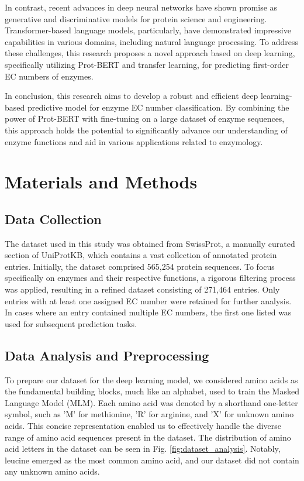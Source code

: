 \documentclass[conference]{IEEEtran}
\begin{document}
In contrast, recent advances in deep neural networks have shown promise as generative and discriminative models for protein science and engineering\cite{16}. Transformer-based language models, particularly, have demonstrated impressive capabilities in various domains, including natural language processing\cite{17}. To address these challenges, this research proposes a novel approach based on deep learning, specifically utilizing Prot-BERT\cite{18} and transfer learning, for predicting first-order EC numbers of enzymes.

In conclusion, this research aims to develop a robust and efficient deep learning-based predictive model for enzyme EC number classification. By combining the power of Prot-BERT with fine-tuning on a large dataset of enzyme sequences, this approach holds the potential to significantly advance our understanding of enzyme functions and aid in various applications related to enzymology.

\newpage


\section{Materials and Methods}\label{sec11}

\subsection{Data Collection}

The dataset used in this study was obtained from SwissProt, a manually curated section of UniProtKB, which contains a vast collection of annotated protein entries\cite{19}. Initially, the dataset comprised 565,254 protein sequences. To focus specifically on enzymes and their respective functions, a rigorous filtering process was applied, resulting in a refined dataset consisting of 271,464 entries. Only entries with at least one assigned EC number were retained for further analysis. In cases where an entry contained multiple EC numbers, the first one listed was used for subsequent prediction tasks.



\subsection{Data Analysis and Preprocessing}



To prepare our dataset for the deep learning model, we considered amino acids as the fundamental building blocks, much like an alphabet, used to train the Masked Language Model (MLM). Each amino acid was denoted by a shorthand one-letter symbol, such as 'M' for methionine, 'R' for arginine, and 'X' for unknown amino acids. This concise representation enabled us to effectively handle the diverse range of amino acid sequences present in the dataset. The distribution of amino acid letters in the dataset can be seen in Fig. \ref{fig:dataset_analysis}. Notably, leucine emerged as the most common amino acid, and our dataset did not contain any unknown amino acids.
\end{document}
